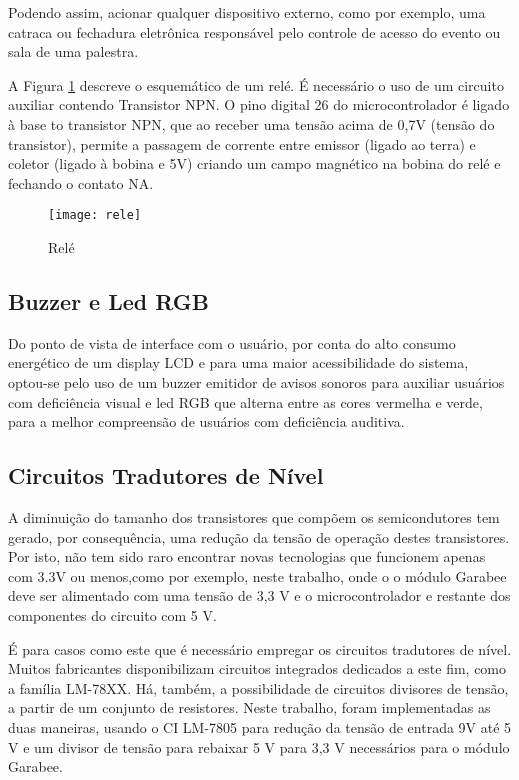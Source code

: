 \documentclass[tcc,capa]{texufpel}
\begin{document}
            Podendo assim, acionar qualquer dispositivo externo, como por exemplo, uma catraca ou fechadura eletrônica responsável pelo controle de acesso do evento ou sala de uma palestra.
            
            A Figura \ref{rele} descreve o esquemático de um relé. É necessário o uso de um circuito auxiliar contendo Transistor NPN.
            O pino digital 26 do microcontrolador é ligado à base to transistor NPN, que ao receber uma tensão acima de 0,7V (tensão do transistor), permite a passagem de corrente entre emissor (ligado ao terra) e coletor (ligado à bobina e 5V) criando um campo magnético na bobina do relé e fechando o contato NA.
            
            \begin{figure}[H]
                \centering 
                \texttt{[image: rele]}
                \caption{Relé} 
                \label{rele}
            \end{figure}
            
        \subsection{Buzzer e Led RGB}
            
            Do ponto de vista de interface com o usuário, por conta do alto consumo energético de um display LCD e para uma maior acessibilidade do sistema, optou-se pelo uso de um buzzer emitidor de avisos sonoros para auxiliar usuários com deficiência visual e led RGB que alterna entre as cores vermelha e verde, para a melhor compreensão de usuários com deficiência auditiva.
    
    
        \subsection{Circuitos Tradutores de Nível}
        
            A diminuição do tamanho dos transistores que compõem os semicondutores tem gerado, por consequência, uma redução da tensão de operação destes transistores. Por isto, não tem sido raro encontrar novas tecnologias que funcionem apenas com 3.3V ou menos,como por exemplo, neste trabalho, onde o o módulo Garabee deve ser alimentado com uma tensão de 3,3 V e o microcontrolador e restante dos componentes do circuito com 5 V.
            
            É para casos como este que é necessário empregar os circuitos tradutores de nível. Muitos fabricantes disponibilizam circuitos integrados dedicados a este fim, como a família LM-78XX. Há, também, a possibilidade de circuitos divisores de tensão, a partir de um conjunto de resistores. Neste trabalho, foram implementadas as duas maneiras, usando o CI LM-7805 para redução da tensão de entrada 9V até 5 V e um divisor de tensão para rebaixar 5 V para 3,3 V necessários para o módulo Garabee.
        
\end{document}
